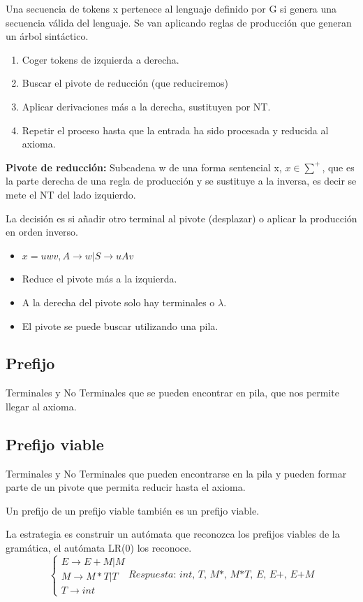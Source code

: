\documentclass[12pt, twoside, openright]{report} %
\begin{document}
Una secuencia de tokens x pertenece al lenguaje definido por G si genera una secuencia válida del lenguaje. Se van aplicando reglas de producción que generan un árbol sintáctico.

\begin{enumerate}
	\item Coger tokens de izquierda a derecha.
	\item Buscar el pivote de reducción (que reduciremos)
	\item Aplicar derivaciones más a la derecha, sustituyen por NT.
	\item Repetir el proceso hasta que la entrada ha sido procesada y reducida al axioma.
\end{enumerate}

\textbf{Pivote de reducción:} Subcadena w de una forma sentencial x, $x \in \sum^+$, que es la parte derecha de una regla de producción y se sustituye a la inversa, es decir se mete el NT del lado izquierdo.

La decisión es si añadir otro terminal al pivote (desplazar) o aplicar la producción en orden inverso.
\begin{itemize}
	\item $x=uwv, A \rightarrow w | S \rightarrow uAv$
	\item Reduce el pivote más a la izquierda.
	\item A la derecha del pivote solo hay terminales o $\lambda$.
	\item El pivote se puede buscar utilizando una pila.
\end{itemize}

\subsection{Prefijo}
Terminales y No Terminales que se pueden encontrar en pila, que nos permite llegar al axioma.

\subsection{Prefijo viable}
Terminales y No Terminales que pueden encontrarse en la pila y pueden formar parte de un pivote que permita reducir hasta el axioma.

Un prefijo de un prefijo viable también es un prefijo viable.

La estrategia es construir un autómata que reconozca los prefijos viables de la gramática, el autómata LR(0) los reconoce.
\vspace{-10px}
$$\begin{cases}
		E \rightarrow E+M | M      \\
		M \rightarrow M*T | T      \\
		T \rightarrow \textit{int}
	\end{cases}
	\textit{Respuesta: int, T, M*, M*T, E, E+, E+M}$$
\end{document}
